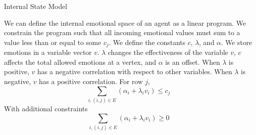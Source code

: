 \documentclass[11pt]{article}
\begin{document}
\begin{section}{Internal State Model}

We can define the internal emotional space of an agent as a linear program. We constrain the program such that all incoming emotional values must sum to a value less than or equal to some $c_j$. We define the constants $c$, $\lambda$, and $\alpha$. We store emotions in a variable vector $v$. $\lambda$ changes the effectiveness of the variable $v$, $c$ affects the total allowed emotions at a vertex, and $\alpha$ is an offset. When $\lambda$ is positive, $v$ has a negative correlation with respect to other variables. When $\lambda$ is negative, $v$ has a positive correlation. For row $j$, 
\[\sum_{i, (i, j) \in E} \left(\alpha_i + \lambda_i v_i\right) \le c_j\]
With additional constraints
\[\sum_{i, (i, j) \in E} \left(\alpha_i + \lambda_i v_i\right) \ge 0\]


\end{section}
\end{document}
